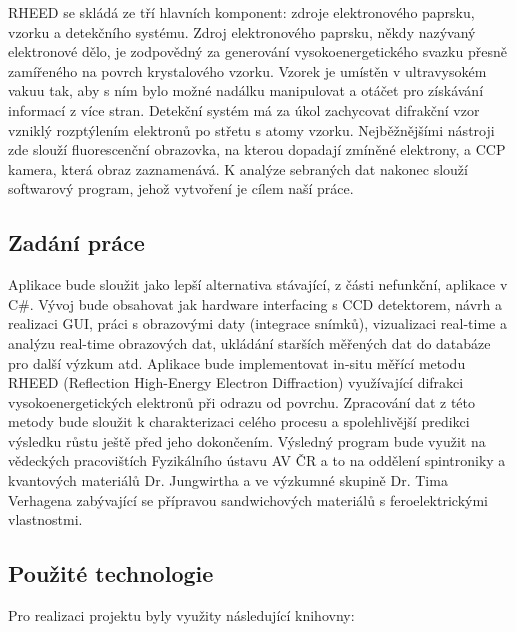 \documentclass{article}
\begin{document}
    RHEED se skládá ze tří hlavních komponent: zdroje elektronového paprsku, vzorku a detekčního systému. Zdroj elektronového paprsku, někdy nazývaný elektronové dělo, je zodpovědný za generování vysokoenergetického svazku přesně zamířeného na povrch krystalového vzorku. Vzorek je umístěn v ultravysokém vakuu tak, aby s ním bylo možné nadálku manipulovat a otáčet pro získávání informací z více stran. Detekční systém má za úkol zachycovat difrakční vzor vzniklý rozptýlením elektronů po střetu s atomy vzorku. Nejběžnějšími nástroji zde slouží fluorescenční obrazovka, na kterou dopadají zmíněné elektrony, a CCP kamera, která obraz zaznamenává. K analýze sebraných dat nakonec slouží softwarový program, jehož vytvoření je cílem naší práce.
    
\subsection{Zadání práce}
    Aplikace bude sloužit jako lepší alternativa stávající, z části nefunkční, aplikace v C\#. Vývoj bude obsahovat jak hardware interfacing s CCD detektorem, návrh a realizaci GUI, práci s obrazovými daty (integrace snímků), vizualizaci real-time a analýzu real-time obrazových dat, ukládání starších měřených dat do databáze pro další výzkum atd. Aplikace bude implementovat in-situ měřící metodu RHEED (Reflection High-Energy Electron Diffraction) využívající difrakci vysokoenergetických elektronů při odrazu od povrchu. Zpracování dat z této metody bude sloužit k charakterizaci celého procesu a spolehlivější predikci výsledku růstu ještě před jeho dokončením. Výsledný program bude využit na vědeckých pracovištích Fyzikálního ústavu AV ČR a to na oddělení spintroniky a kvantových materiálů Dr. Jungwirtha a ve výzkumné skupině Dr. Tima Verhagena zabývající se přípravou sandwichových materiálů s feroelektrickými vlastnostmi.
\subsection{Použité technologie}

Pro realizaci projektu byly využity následující knihovny:
\end{document}
